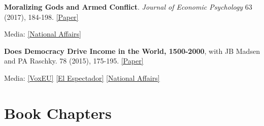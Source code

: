 \documentclass[letterpaper]{article}
\renewenvironment{itemize}{
  \begin{list}{}{
    \setlength{\leftmargin}{1.5em}
  }
}{
  \end{list}
}
\begin{document}
\begin{itemize}
	
	\medskip
	
				  \item \begin{flushleft} {\bf Moralizing Gods and Armed Conflict}. \linebreak \textit{Journal of Economic Psychology} 63 (2017), 184-198. \href{https://drive.google.com/file/d/0BwqbQjw0aU48bWlWVkEwRC1Ma0E/view?usp=sharing}{[Paper]} 
				  \end{flushleft}			  
				  	\vspace{-0.05in}
				  \begin{itemize}
				  	Media: \href{https://www.nationalaffairs.com/blog/detail/findings-a-daily-roundup/blessed-and-cursed}{[National Affairs]}
				  \end{itemize}
				  
	
	\medskip
	
\item {\bf Does Democracy Drive Income in the World, 1500-2000}, with JB Madsen and PA Raschky.  78 (2015), 175-195. \href{http://www.sciencedirect.com/science/article/pii/S0014292115000707}{[Paper]} 
				  
\vspace{-0.05in}
\begin{itemize}
	Media: \href{https://voxeu.org/article/revisiting-causal-effect-democracy-long-run-development}{[VoxEU]} \href{https://blogs.elespectador.com/economia/el-mal-economista/y-la-democracia-para-que}{[El Espectador]} \href{https://www.nationalaffairs.com/blog/detail/findings-a-daily-roundup/backward}{[National Affairs]}
\end{itemize}



\end{itemize}

\section*{Book Chapters}
\end{document}
